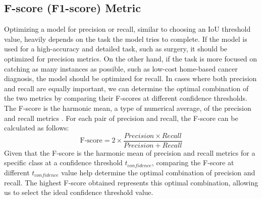 \subsection{F-score (F1-score) Metric}  \label{subsec:f_score}
Optimizing a model for precision or recall, similar to choosing an IoU threshold value, heavily depends on the task the model tries to complete. If the model is used for a high-accuracy and detailed task, such as surgery, it should be optimized for precision metrics. On the other hand, if the task is more focused on catching as many instances as possible, such as low-cost home-based cancer diagnosis, the model should be optimized for recall. In cases where both precision and recall are equally important, we can determine the optimal combination of the two metrics by comparing their F-scores at different confidence thresholds. The F-score is the harmonic mean, a type of numerical average, of the precision and recall metrics \cite{fscore_2017}. For each pair of precision and recall, the F-score can be calculated as follows:
\begin{equation}
    \text{F-score} = 2 \times \frac{Precision \times Recall}{Precision + Recall}
\end{equation}
Given that the F-score is the harmonic mean of precision and recall metrics for a specific class at a confidence threshold $t_{confidence}$, comparing the F-score at different $t_{confidence}$ value help determine the optimal combination of precision and recall. The highest F-score obtained represents this optimal combination, allowing us to select the ideal confidence threshold value.

